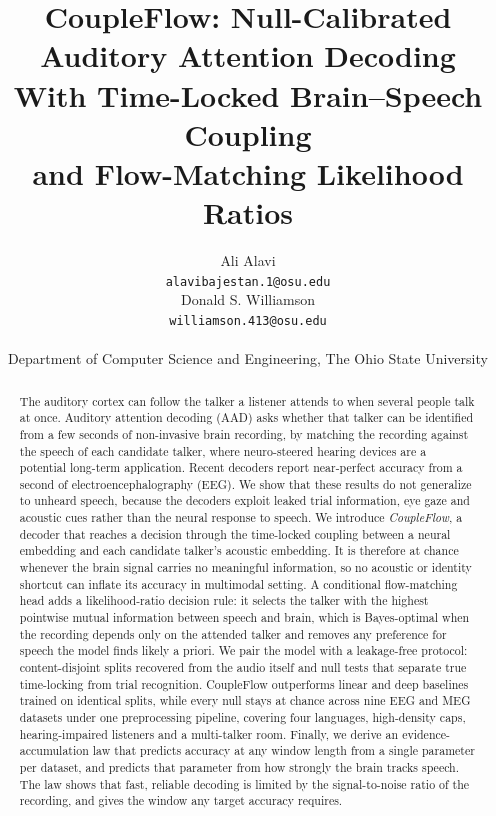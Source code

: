 \documentclass[10pt,twocolumn,letterpaper]{article}
\begin{document}
\title{CoupleFlow: Null-Calibrated Auditory Attention Decoding\\ With Time-Locked
Brain--Speech Coupling\\ and Flow-Matching Likelihood Ratios}
\author{\begin{tabular}[t]{c}Ali Alavi\\ \normalsize\texttt{alavibajestan.1@osu.edu}\end{tabular}\hspace{3em}\begin{tabular}[t]{c}Donald S. Williamson\\ \normalsize\texttt{williamson.413@osu.edu}\end{tabular}\\[0.5em]
\normalsize Department of Computer Science and Engineering, The Ohio State University}
\date{}
\maketitle

\begin{abstract}

The auditory cortex can follow the talker a listener attends to when several people talk at once. Auditory attention decoding (AAD) asks whether that talker can be identified from a few seconds of non-invasive brain recording, by matching the recording against the speech of each candidate talker, where neuro-steered hearing devices are a potential long-term application. Recent decoders report near-perfect accuracy from a second of electroencephalography (EEG). We show that these results do not generalize to unheard speech, because the decoders exploit leaked trial information, eye gaze and acoustic cues rather than the neural response to speech. We introduce \emph{CoupleFlow}, a decoder that reaches a decision through the
time-locked coupling between a neural embedding and each candidate talker's acoustic embedding. It is therefore at chance whenever the brain signal carries no
meaningful information, so no acoustic or identity shortcut can inflate its accuracy in multimodal setting. A conditional
flow-matching head adds a likelihood-ratio decision rule: it selects the talker with the highest pointwise mutual information between speech and brain, which is Bayes-optimal when the recording depends only on the
attended talker and removes any preference for speech the model finds likely a priori. We pair the model
with a leakage-free protocol: content-disjoint splits recovered from the audio itself and
null tests that separate true time-locking from trial recognition. 
CoupleFlow outperforms linear and deep baselines trained on identical splits, while every null stays at chance across nine EEG and MEG datasets under one preprocessing pipeline, covering four languages, high-density caps, hearing-impaired listeners and a multi-talker room.
Finally, we derive
an evidence-accumulation law that predicts accuracy at any window length from a single
parameter per dataset, and predicts that parameter from how strongly the brain tracks
speech. The law shows that fast, reliable decoding is limited by the signal-to-noise ratio
of the recording, and gives the window any target accuracy requires.
\end{abstract}
\end{document}
